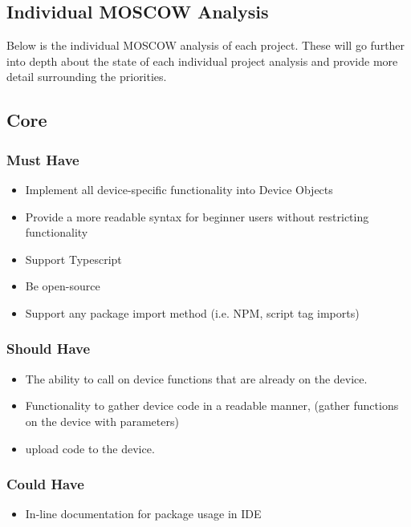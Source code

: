 \documentclass{l4proj}
\begin{document}
\begin{appendices}
\chapter{Individual MOSCOW Analysis}


\label{appendix:MOSCOWAnalysis}

Below is the individual MOSCOW analysis of each project. These will go further into depth about the state of each individual project analysis and provide more detail surrounding the priorities.


\section{Core}
\subsection{Must Have}
\begin{itemize}
    \item Implement all device-specific functionality into Device Objects
    \item Provide a more readable syntax for beginner users without restricting functionality
    \item Support Typescript
    \item Be open-source
    \item Support any package import method (i.e. NPM, script tag imports)
\end{itemize}
\subsection{Should Have}
\begin{itemize}
    \item The ability to call on device functions that are already on the device.
    \item Functionality to gather device code in a readable manner, (gather functions on the device with parameters)
    \item upload code to the device.
\end{itemize}
\subsection{Could Have}
\begin{itemize}
    \item In-line documentation for package usage in IDE
\end{itemize}


\end{appendices}
\end{document}
